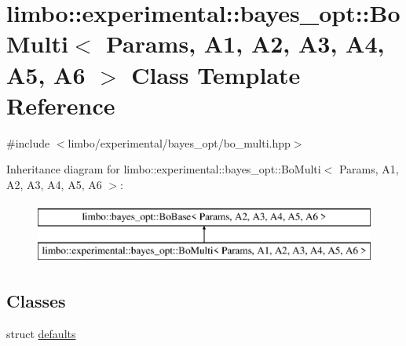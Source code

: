 \hypertarget{classlimbo_1_1experimental_1_1bayes__opt_1_1_bo_multi}{}\section{limbo\+:\+:experimental\+:\+:bayes\+\_\+opt\+:\+:Bo\+Multi$<$ Params, A1, A2, A3, A4, A5, A6 $>$ Class Template Reference}
\label{classlimbo_1_1experimental_1_1bayes__opt_1_1_bo_multi}


{\ttfamily \#include $<$limbo/experimental/bayes\+\_\+opt/bo\+\_\+multi.\+hpp$>$}

Inheritance diagram for limbo\+:\+:experimental\+:\+:bayes\+\_\+opt\+:\+:Bo\+Multi$<$ Params, A1, A2, A3, A4, A5, A6 $>$\+:\begin{figure}[H]
\begin{center}
\leavevmode
\includegraphics[height=2.000000cm]{classlimbo_1_1experimental_1_1bayes__opt_1_1_bo_multi}
\end{center}
\end{figure}
\subsection*{Classes}
\begin{DoxyCompactItemize}
\item 
struct \hyperlink{structlimbo_1_1experimental_1_1bayes__opt_1_1_bo_multi_1_1defaults}{defaults}
\end{DoxyCompactItemize}
